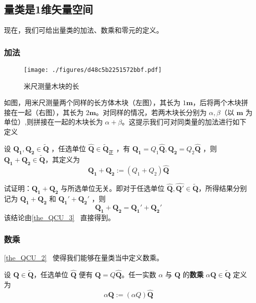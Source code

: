 \subsection{量类是1维矢量空间}
现在，我们可给出量类的加法、数乘和零元的定义。
\subsubsection{加法}
\begin{figure}[ht]
\centering
\texttt{[image: ./figures/d48c5b2251572bbf.pdf]}
\caption{米尺测量木块的长} \label{fig_QCC_1}
\end{figure}
如图，用米尺测量两个同样的长方体木块（左图），其长为 $1\boldsymbol{m}$，后将两个木块拼接在一起（右图），其长为 $2\boldsymbol{m}$。对同样的情况，若两木块长分别为 $\alpha ,\beta$（以 $\boldsymbol{m}$ 为单位）,则拼接在一起的木块长为 $\alpha+\beta$。这提示我们可对同类量的加法进行如下定义
\begin{definition}{}
设 $\boldsymbol{Q_1},\boldsymbol{Q_2}\in \tilde{\boldsymbol{Q}}$ ，任选单位 $\hat{\boldsymbol{Q}}\in\tilde{\boldsymbol{Q}}_{\text{正}}$ ，有 $\boldsymbol{Q_1}=Q_1\hat{\boldsymbol{Q}}, \boldsymbol{Q_2}=Q_2\hat{\boldsymbol{Q}}$ ，则 $\boldsymbol{Q_1}+\boldsymbol{Q_2}\in\tilde{\boldsymbol{Q}}$，其定义为
\begin{equation}
\boldsymbol{Q_1}+\boldsymbol{Q_2}:=(Q_1+Q_2)\hat{\boldsymbol{Q}}
\end{equation}
\end{definition}
\begin{example}{}
试证明：$\boldsymbol{Q_1}+\boldsymbol{Q_2}$ 与所选单位无关。即对于任选单位 $\hat{\boldsymbol{Q}},\hat{\boldsymbol{Q'}}\in\tilde{\boldsymbol{Q}}$，所得结果分别记为 $\boldsymbol{Q_1}+\boldsymbol{Q_2}$ 和 $\boldsymbol{Q_1}'+\boldsymbol{Q_2}'$ ，则
\begin{equation}
\boldsymbol{Q_1}+\boldsymbol{Q_2} =\boldsymbol{Q_1}'+\boldsymbol{Q_2}'
\end{equation}
 该结论由\autoref{the_QCU_3}~ 直接得到。
\end{example}
\subsubsection{数乘}
\autoref{the_QCU_2}~ 使得我们能够在量类当中定义数乘。
\begin{definition}{}
设 $\boldsymbol{Q}\in\tilde{\boldsymbol{Q}}$，任选单位 $\hat{\boldsymbol{Q}}$ 便有 $\boldsymbol{Q}=Q\hat{\boldsymbol{Q}}$。任一实数 $\alpha$ 与 $\boldsymbol{Q}$ 的\textbf{数乘} $\alpha\boldsymbol{Q}\in\tilde{\boldsymbol{Q}}$ 定义为
\begin{equation}
\alpha\boldsymbol{Q}:=(\alpha Q)\hat{\boldsymbol{Q}}
\end{equation}
\end{definition}
